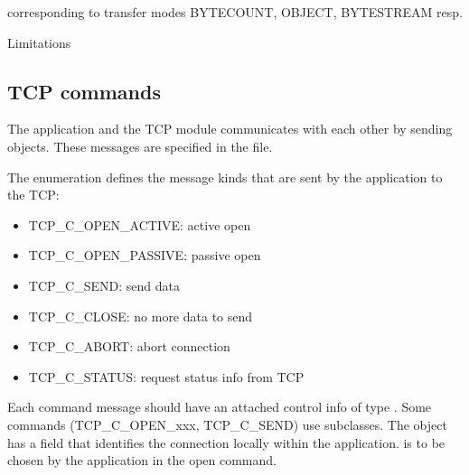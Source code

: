 corresponding to transfer modes BYTECOUNT, OBJECT, BYTESTREAM resp.

Limitations


\subsection{TCP commands}

The application and the TCP module communicates with each other
by sending  objects. These messages are specified
in the  file.

The  enumeration defines the message kinds
that are sent by the application to the TCP:
\begin{itemize}
  \item TCP\_C\_OPEN\_ACTIVE: active open
  \item TCP\_C\_OPEN\_PASSIVE: passive open
  \item TCP\_C\_SEND: send data
  \item TCP\_C\_CLOSE: no more data to send
  \item TCP\_C\_ABORT: abort connection
  \item TCP\_C\_STATUS: request status info from TCP
\end{itemize}

Each command message should have an attached control info of type .
Some commands (TCP\_C\_OPEN\_xxx, TCP\_C\_SEND) use subclasses.
The  object has a  field that identifies the
connection locally within the application.  is to be chosen by the
application in the open command.

